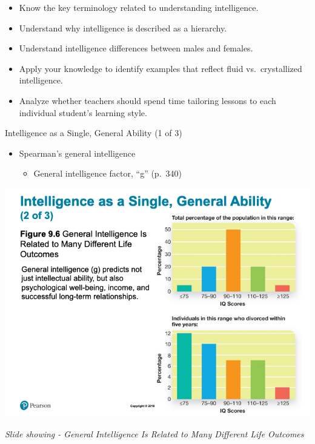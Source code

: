 \documentclass[
]{book}
\providecommand{\tightlist}{%
  \setlength{\itemsep}{0pt}\setlength{\parskip}{0pt}}
\begin{document}
\begin{reflect}
\begin{itemize}
\tightlist
\item
  Know the key terminology related to understanding intelligence.\\
\item
  Understand why intelligence is described as a hierarchy.\\
\item
  Understand intelligence differences between males and females.\\
\item
  Apply your knowledge to identify examples that reflect fluid vs.~crystallized intelligence.\\
\item
  Analyze whether teachers should spend time tailoring lessons to each individual student's learning style.
\end{itemize}

Intelligence as a Single, General Ability (1 of 3)

\begin{itemize}
\tightlist
\item
  Spearman's general intelligence

  \begin{itemize}
  \tightlist
  \item
    General intelligence factor, ``g'' (p.~340)
  \end{itemize}
\end{itemize}

\includegraphics{assets/unit_2/slide_23.png}

\emph{Slide showing - General Intelligence Is Related to Many Different Life Outcomes}


\end{reflect}
\end{document}
